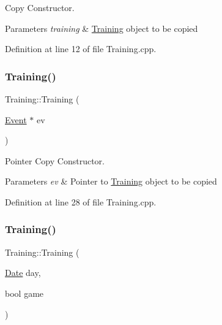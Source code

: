 Copy Constructor. 


\begin{DoxyParams}{Parameters}
{\em training} & \hyperlink{class_training}{Training} object to be copied \\
\hline
\end{DoxyParams}


Definition at line 12 of file Training.\+cpp.

\hypertarget{class_training_ae39813d608325645cb3403160fc3b493}{}\label{class_training_ae39813d608325645cb3403160fc3b493} 
\subsubsection{\texorpdfstring{Training()}{Training()}\hspace{0.1cm}{\footnotesize\ttfamily [3/4]}}
{\footnotesize\ttfamily Training\+::\+Training (\begin{DoxyParamCaption}\item[{\hyperlink{class_event}{Event} $\ast$}]{ev }\end{DoxyParamCaption})}



Pointer Copy Constructor. 


\begin{DoxyParams}{Parameters}
{\em ev} & Pointer to \hyperlink{class_training}{Training} object to be copied \\
\hline
\end{DoxyParams}


Definition at line 28 of file Training.\+cpp.

\hypertarget{class_training_a314d31d73f207b1c9cb2720da663d225}{}\label{class_training_a314d31d73f207b1c9cb2720da663d225} 
\subsubsection{\texorpdfstring{Training()}{Training()}\hspace{0.1cm}{\footnotesize\ttfamily [4/4]}}
{\footnotesize\ttfamily Training\+::\+Training (\begin{DoxyParamCaption}\item[{\hyperlink{class_date}{Date}}]{day,  }\item[{bool}]{game }\end{DoxyParamCaption})\hspace{0.3cm}{\ttfamily [inline]}}



